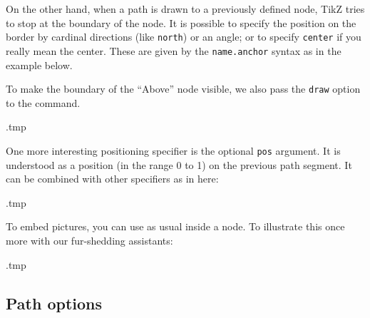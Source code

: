 On the other hand, when a path is drawn to a previously defined node,
TikZ tries to stop at the boundary of the node.
It is possible to specify the position on the border by cardinal directions (like \verb|north|)
or an angle; or to specify \verb|center| if you really mean the center.
These are given by the \verb|name.anchor| syntax as in the example below.

To make the boundary of the ``Above'' node visible,
we also pass the \verb|draw| option to the  command.
%
\begin{VerbatimOut}{\jobname.tmp}
\end{VerbatimOut}
\ShowExample

One more interesting positioning specifier is the optional \verb|pos| argument.
It is understood as a position (in the range 0 to 1) on the previous path segment.
It can be combined with other specifiers as in here:
%
\begin{VerbatimOut}{\jobname.tmp}
\end{VerbatimOut}
\ShowExample

To embed pictures,
you can use  as usual inside a node.
To illustrate this once more with our fur-shedding assistants:
%
\begin{VerbatimOut}{\jobname.tmp}
\centering
\newcommand{\dogfile}{pictures/TheDogs.jpg}
\end{VerbatimOut}
\ShowExampleBelow[2]


%
%
\subsection{Path options}

